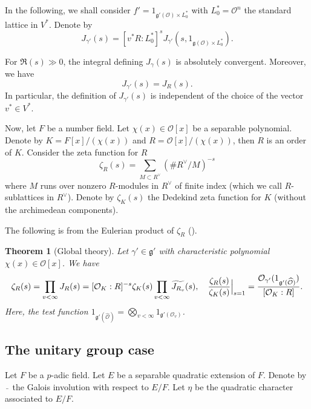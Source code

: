 \documentclass[a4paper]{amsart}
\newcommand{\CO}{{\mathcal {O}}} \newcommand{\CP}{{\mathcal {P}}}
\newcommand{\fg}{{\mathfrak{g}}} \newcommand{\fh}{{\mathfrak{h}}}
\newcommand{\wh}{\widehat}
\theoremstyle{plain}
\newtheorem{thm}{Theorem}[section] \newtheorem{cor}[thm]{Corollary}
\theoremstyle{remark} \newtheorem{remark}[thm]{Remark}
\theoremstyle{exercise} \newtheorem{exercise}[thm]{Exercise}
\theoremstyle{example} \newtheorem{example}[thm]{Example}
\theoremstyle{question} \newtheorem{question}[thm]{Question}
\theoremstyle{assumption} \newtheorem{assumption}[thm]{Assumption}
\numberwithin{equation}{section}
\begin{document}
In the following, we shall consider $f' = 1_{\fg'(\CO) \times L_0^*}$ with $L_0^* =\CO^n$ the standard lattice in $V^*$.
Denote by 
\[J_{\gamma'}(s) = [v^*R:L_0^*]^s J_{\gamma'}\left( s,1_{\fg(\CO) \times L_0^*} \right).\]


\begin{prop} \label{prop-gl-jacquet}
    For $\Re(s) \gg 0$, the integral defining $J_\gamma(s)$
    is absolutely convergent. Moreover, we have
    \[J_{\gamma'}(s) = J_R(s).\]
    In particular, the definition of $J_{\gamma'}(s)$ is independent of the choice of the vector $v^* \in V^*$.
\end{prop}




Now, let $F$ be a number field. Let $\chi(x) \in \CO[x]$ be a separable polynomial. Denote by $K = F[x]/(\chi(x))$ and
$R = \CO[x]/(\chi(x))$, then $R$ is an order of $K$. Consider the zeta function for $R$
\[\zeta_R(s) = \sum_{M \subset R^\vee} \left( \# R^\vee/M \right)^{-s}\]
where $M$ runs over nonzero $R$-modules in  $R^\vee$ of finite index (which we call $R$-sublattices in $R^\vee$). Denote by
$\zeta_K(s)$ the Dedekind zeta function for $K$ (without the archimedean components).

The following is from the Eulerian product of $\zeta_R$  (\cite[(Equation (3.2)]{Yun13}).

\begin{thm}[Global theory]\label{thm-gl-global} Let $\gamma' \in \fg'$ with characteristic polynomial $\chi(x) \in \CO[x]$.  We have
	\[\zeta_R(s) = \prod_{v < \infty} J_R(s) = [\CO_K:R]^{-s}\zeta_K(s) \prod_{v < \infty} \wt{J_{R_v}}(s), \quad
	\frac{\zeta_R(s)}{\zeta_K(s)}\Big|_{s=1} = \frac{\CO_{\gamma'}(1_{\fg'(\wh{\CO})})}{[\CO_K:R]}.\]
    Here, the test function $1_{\fg'(\wh{\CO})} = \bigotimes_{v < \infty} 1_{\fg'(\CO_v)}$.
\end{thm}


\subsection{The unitary group case}\label{sec-unitary}


Let $F$ be a $p$-adic field. Let $E$ be a separable quadratic extension of $F$. Denote by $\,\bar{}\,$ the Galois involution with respect to
$E/F$. Let $\eta$ be the quadratic character associated to $E/F$.
\end{document}
